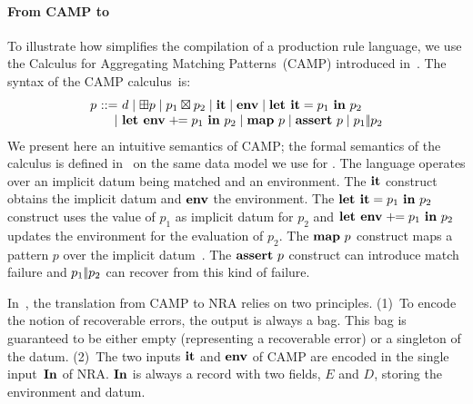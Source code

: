 \paragraph*{From CAMP to \NRAEnv}

To illustrate how \NRAEnv simplifies the compilation of a production
rule language, we use the Calculus for Aggregating Matching
Patterns~(CAMP) introduced in~\cite{ShinnarSH15}.
%
The syntax of the CAMP calculus\, is: 
$$
\begin{array}{l@{\ }r@{\ }l}
p & ::= &
 d %
  \mid   \opunop p %
  \mid   p_1 \opbinop p_2 %
  \mid   \rit %
  \mid   \renv
  \mid   \ensuremath{\rleti{p_1}{p_2}} %
\\
 &\mid&  \rlete{p_1}{p_2} %
  \mid   \rmap{p} %
  \mid   \rassert{p} %
  \mid   p_1\ror p_2 %
\end{array}
$$
We present here an intuitive semantics of CAMP; the formal semantics
of the calculus is defined in~\cite{ShinnarSH15} on the same data
model we use for \NRAEnv.
The language operates over an implicit datum being matched
and an environment. The $\textup{\textbf{{it}}}$ construct obtains the implicit datum
and $\textup{\textbf{{env}}}$ the environment.
%
The $\textup{\textbf{{let it}}} = {p_1}~\textup{\textbf{{in}}}~{p_2}$ construct uses the value of $p_1$ as implicit
datum for $p_2$ and $\textup{\textbf{{let env}}}\;+\!\!= {p_1}~\textup{\textbf{{in}}}~{p_2}$ updates the environment for the
evaluation of $p_2$.
%
The $\textup{\textbf{{map}}}~{p}$ construct maps a pattern $p$ over the implicit
datum~\rit.
%
The $\textup{\textbf{{assert}}}~{p}$ construct can introduce match failure and
$p_1|\!| p_2$ can recover from this kind of failure.

%

In~\cite{ShinnarSH15}, the translation from CAMP to NRA relies on two
principles.  (1)~To encode the notion of recoverable errors, the
output is always a bag. This bag is guaranteed to be either empty
(representing a recoverable error) or a singleton of the datum. (2)~The
two inputs $\textup{\textbf{{it}}}$ and $\textup{\textbf{{env}}}$ of CAMP are encoded in the single
input~$\textup{\textbf{{In}}}$ of NRA. $\textup{\textbf{{In}}}$ is always a record with two fields, $E$
and $D$, storing the environment and datum.

